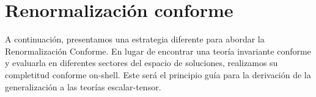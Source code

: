 \documentclass[../Main.tex]{subfiles}
\begin{document}






\section{Renormalización conforme}\label{sec:CR}
A continuación, presentamos una estrategia diferente para abordar la Renormalización Conforme. En lugar de encontrar una teoría invariante conforme y evaluarla en diferentes sectores del espacio de soluciones, realizamos su completitud conforme on-shell. Este será el principio guía para la derivación de la generalización a las teorías escalar-tensor.
\end{document}
